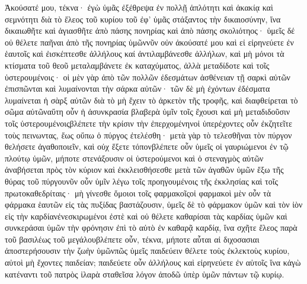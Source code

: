 Ἀκούσατέ μου, τέκνα· ἐγὼ ὑμᾶς ἐξέθρεψα ἐν πολλῇ ἁπλότητι καὶ ἀκακίᾳ καὶ σεμνότητι διὰ τὸ ἔλεος τοῦ κυρίου τοῦ ἐφ’ ὑμᾶς στάξαντος τὴν δικαιοσύνην, ἵνα δικαιωθῆτε καὶ ἁγιασθῆτε ἀπὸ πάσης πονηρίας καὶ ἀπὸ πάσης σκολιότηος· ὑμεῖς δέ οὐ θέλετε παῆναι ἀπὸ τῆς πονηρίας ὑμῶννῦν οὐν ἀκούσατέ μου καὶ εἰ εἰρηνεύετε ἐν ἑαυτοῖς καὶ ἐισκέπτεσθε ἀλλήλους καί ἀντιλαμβάνεσθε ἀλλήλων, καὶ μὴ μόνοι τὰ κτίσματα τοῦ θεοῦ μεταλαμβάνετε ἐκ καταχύματος, ἀλλὰ μεταδίδοτε καὶ τοῖς ὑστερουμένοις· οἱ μὲν γὰρ ἀπὸ τῶν πολλῶν ἐδεσμάτων ἀσθένειαν τῇ σαρκὶ αὐτῶν ἐπισπῶνται καὶ λυμαίνονται τὴν σάρκα αὐτῶν· τῶν δὲ μὴ ἐχόντων ἐδέσματα λυμαίνεται ἡ σὰρξ αὐτῶν διὰ τὸ μὴ ἔχειν τὸ ἀρκετὸν τῆς τροφῆς, καὶ διαφθείρεται τὸ σῶμα αὐτῶναὕτη οὖν ἡ ἀσυνκρασία βλαβερὰ ὑμῖν τοῖς ἔχουσι καὶ μὴ μεταδιδοῦσιν τοῖς ὑστερουμένοιςβλέπετε τὴν κρίσιν τὴν ἐπερχομένηνοἱ ὑπερέχοντες οὖν ἐκζητεῖτε τοὺς πεινωντας, ἕως οὔπω ὁ πύργος ἐτελέσθη· μετὰ γὰρ τὸ τελεσθῆναι τὸν πύργον θελήσετε ἀγαθοποιεῖν, καὶ οὐχ ἕξετε τόπονβλέπετε οὖν ὑμεῖς οἱ γαυριώμενοι ἐν τῷ πλούτῳ ὑμῶν, μήποτε στενάξουσιν οἱ ὑστερούμενοι καὶ ὁ στεναγμὸς αὐτῶν ἀναβήσεται πρὸς τὸν κύριον καὶ ἐκκλεισθήσεσθε μετὰ τῶν ἀγαθῶν ὑμῶν ἔξω τῆς θύρας τοῦ πύργουνῦν οὖν ὑμῖν λέγω τοῖς προηγουμένοις τῆς ἐκκλησίας καὶ τοῖς πρωτοκαθεδρίταις· μὴ γίνεσθε ὅμοιοι τοῖς φαρμακοῖςοἱ φαρμακοὶ μὲν οὖν τὰ φάρμακα ἑαυτῶν εἰς τὰς πυξίδας βαστάζουσιν, ὑμεῖς δὲ τὸ φάρμακον ὑμῶν καὶ τὸν ἰὸν εἰς τὴν καρδίανἐνεσκιρωμένοι ἐστὲ καὶ οὐ θέλετε καθαρίσαι τὰς καρδίας ὑμῶν καὶ συνκεράσαι ὑμῶν τὴν φρόνησιν ἐπὶ τὸ αὐτὸ ἐν καθαρᾷ καρδίᾳ, ἵνα σχῆτε ἔλεος παρὰ τοῦ βασιλέως τοῦ μεγάλουβλέπετε οὖν, τέκνα, μήποτε αὗται αἱ διχοσασιαι ἀποστερήσουσιν τὴν ζωὴν ὑμῶνπῶς ὑμεῖς παιδεύειν θέλετε τοὺς ἐκλεκτοὺς κυρίου, αὐτοὶ μὴ ἔχοντες παιδείαν; παιδεύετε οὖν ἀλλήλους καὶ εἰρηνεύετε ἐν αὑτοῖς ἵνα κἀγὼ κατέναντι τοῦ πατρὸς ἱλαρὰ σταθεῖσα λόγον ἀποδῶ ὑπὲρ ὑμῶν πάντων τῷ κυρίῳ.
